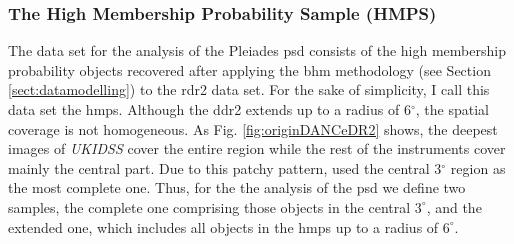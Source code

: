 \subsubsection{The High Membership Probability Sample (HMPS)}
The data set for the analysis of the Pleiades \gls{psd} consists of the high membership probability objects recovered after applying the \gls{bhm} methodology (see Section \ref{sect:datamodelling}) to the \gls{rdr2} data set. For the sake of simplicity, I call this data set the \gls{hmps}. Although the \gls{ddr2} extends up to a radius of 6$^{\circ}$, the spatial coverage is not homogeneous. As Fig. \ref{fig:originDANCeDR2} shows, the deepest images of \emph{UKIDSS} cover the entire region while the rest of the instruments cover mainly the central part. Due to this patchy pattern, \citet{Bouy2015} used the central 3$^{\circ}$ region as the most complete one. Thus, for the the analysis of the \gls{psd} we define two samples, the complete one comprising those objects in the central $3^{\circ}$, and the extended one, which includes all objects in the \gls{hmps} up to a radius of $6^{\circ}$.



